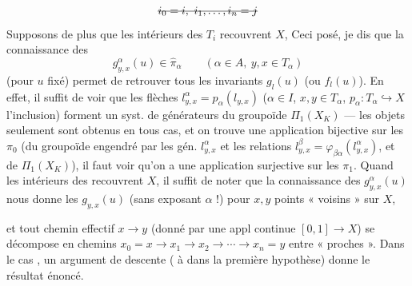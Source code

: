 \documentclass[11pt,a4paper]{article}
\begin{document}
\[
\text{\struck{$i_0 = i,\ i_1, \ldots, i_n = j$}}
\]
Supposons de plus que les intérieurs des $T_i$ recouvrent $X$, \struck{(\ill{})}  Ceci posé, je dis que la connaissance des
\[
g^{\alpha}_{y,x}(u) \in \widehat{\pi}_\alpha \qquad (\alpha \in A,\ y, x \in T_\alpha)
\]
(pour $u$ fixé) permet de retrouver tous les invariants $g_l(u)$ (ou $f_l(u)$). En effet, il suffit de voir que les flèches $l^{\alpha}_{y,x} = p_\alpha(l_{y,x})$ ($\alpha \in I$, $x, y \in T_\alpha$, $p_\alpha : T_\alpha \hookrightarrow X$ l'inclusion) \struck{\ill{}} forment un syst. de générateurs du groupoïde $\Pi_1(X_K)$ —  les objets seulement sont obtenus \struck{\ill{}} en tous cas, et on trouve une application bijective sur les $\pi_0$ (du groupoïde engendré par les gén. $l^{\alpha}_{y,x}$  et les relations $l^{\beta}_{y,x} = \varphi_{\beta\alpha}(l^{\alpha}_{y,x})$, et de $\Pi_1(X_K)$), il faut voir qu'on a une application surjective sur les $\pi_1$. Quand les intérieurs des   recouvrent $X$, il suffit de noter que la connaissance des $g^{\alpha}_{y,x}(u)$ nous donne les $g_{y,x}(u)$ (sans exposant $\alpha$ !) pour $x, y$ points « voisins » sur $X$,


et tout chemin effectif $x \to y$ (donné par une appl continue $[0,1] \to X$) se décompose en  chemins  $x_0 = x \to x_1 \to x_2 \to \cdots \to x_n = y$ entre \struck{\ill{}}  « proches ». Dans le cas  , un argument de descente ( à  dans la première hypothèse) donne le résultat énoncé.
\end{document}
